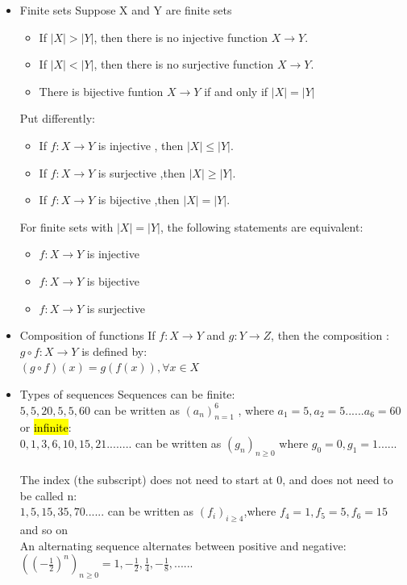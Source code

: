 \documentclass{article}
\begin{document}
\begin{itemize}
\item Finite sets
Suppose X and Y are finite sets
\begin{itemize}
\item If $|X| > |Y|$, then there is no injective function $X \rightarrow Y$.
\item If $|X| < |Y|$, then there is no surjective function $X \rightarrow Y$.
\item There is bijective funtion $X \rightarrow Y$ if and only if $|X| = |Y|$
\end{itemize}
Put differently:
\begin{itemize}
\item If $f : X \rightarrow Y$ is injective , then $|X| \leq |Y|$. 
\item If $f : X \rightarrow Y$ is surjective ,then $|X| \geq |Y|$.
\item If $f : X \rightarrow Y$ is bijective ,then $|X| = |Y|$.
\end{itemize}
For finite sets with $|X| = |Y|$, the following statements
are equivalent:
\begin{itemize}
\item $f : X \rightarrow Y$ is injective
\item $f : X \rightarrow Y$ is bijective
\item $f : X \rightarrow Y$ is surjective
\end{itemize}
 
 \item Composition of functions
 If $f : X \rightarrow Y$ and $g : Y \rightarrow Z$, then the composition : \\
 $g \circ f : X \rightarrow Y$ is defined by:\\
 $(g \circ f)(x) = g(f(x)),\forall x \in X$
 
 \item Types of sequences
 Sequences can be finite:\\
 $5,5,20,5,5,60$ can be written as $(a_n)_{n=1}^6$ , where $a_1 = 5,a_2 = 5 . . . . . . a_6 = 60$\\
 or \hl{infinite}:\\
 $0,1,3,6,10,15,21 .. .. ....$ can be written as $(g_n)_{n \geq 0}$ where $g_0 = 0,g_1 = 1 ......$\\\\
 The index (the subscript) does not need to start at 0, and does not need
to be called n:\\
$1,5,15,35,70......$ can be written as $(f_i)_{i \geq 4}$,where $f_4 = 1,f_5 = 5, f_6 =15$ and so on\\
An alternating sequence alternates between positive and negative:\\
$((-\frac{1}{2})^n)_{n \geq 0} = 1, -\frac{1}{2},\frac{1}{4},-\frac{1}{8}, ......$
  

\end{itemize}
\end{document}

